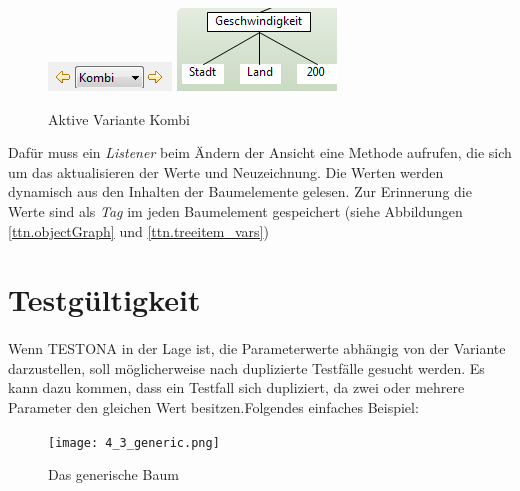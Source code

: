 \begin{figure}[h!]
  \begin{center}
    \includegraphics{4_2_Change_Var_Kombi.png}
    \includegraphics[scale=0.9]{4_2_Change_Var_Kombi_Tree.png}
  		  \caption{Aktive Variante Kombi}
     \label{ttn.3}
  \end{center}
\end{figure}

Dafür muss ein \textit{Listener} beim Ändern der Ansicht eine Methode aufrufen, die sich um das aktualisieren der Werte und Neuzeichnung. Die Werten werden dynamisch aus den Inhalten der Baumelemente gelesen. Zur Erinnerung die Werte sind als \textit{Tag} im jeden Baumelement gespeichert (siehe Abbildungen \ref{ttn.objectGraph} und \ref{ttn.treeitem_vars})


\newpage
\section{Testgültigkeit}
\paragraph{}
Wenn TESTONA in der Lage ist, die Parameterwerte abhängig von der Variante darzustellen, soll möglicherweise nach duplizierte Testfälle gesucht werden. Es kann dazu kommen, dass ein Testfall sich dupliziert, da zwei oder mehrere Parameter den gleichen Wert besitzen.Folgendes einfaches Beispiel:\\

\begin{figure}[h!]
  \begin{center}
    \texttt{[image: 4\_3\_generic.png]}
  		  \caption{Das generische Baum}
     \label{ttn.cases_generic}
  \end{center}
\end{figure}

